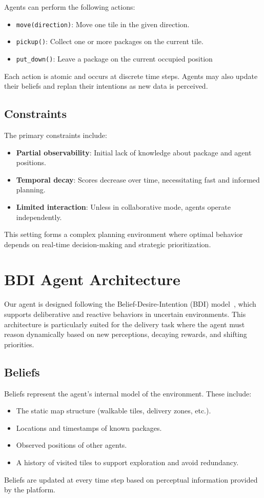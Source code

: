 \documentclass[conference]{IEEEtran}
\begin{document}
Agents can perform the following actions:
\begin{itemize}
	\item \texttt{move(direction)}: Move one tile in the given direction.
	\item \texttt{pickup()}: Collect one or more packages on the current tile.
	\item \texttt{put\_down()}: Leave a package on the current occupied position
\end{itemize}

Each action is atomic and occurs at discrete time steps. Agents may also update their beliefs and replan their intentions as new data is perceived.

\subsection{Constraints}

The primary constraints include:
\begin{itemize}
	\item \textbf{Partial observability}: Initial lack of knowledge about package and agent positions.
	\item \textbf{Temporal decay}: Scores decrease over time, necessitating fast and informed planning.
	\item \textbf{Limited interaction}: Unless in collaborative mode, agents operate independently.
\end{itemize}

This setting forms a complex planning environment where optimal behavior depends on real-time decision-making and strategic prioritization.

\section{BDI Agent Architecture}

Our agent is designed following the Belief-Desire-Intention (BDI) model~\cite{rao1995bdi}, which supports deliberative and reactive behaviors in uncertain environments. This architecture is particularly suited for the delivery task where the agent must reason dynamically based on new perceptions, decaying rewards, and shifting priorities.

\subsection{Beliefs}

Beliefs represent the agent’s internal model of the environment. These include:
\begin{itemize}
	\item The static map structure (walkable tiles, delivery zones, etc.).
	\item Locations and timestamps of known packages.
	\item Observed positions of other agents.
	\item A history of visited tiles to support exploration and avoid redundancy.
\end{itemize}
Beliefs are updated at every time step based on perceptual information provided by the platform.
\end{document}
